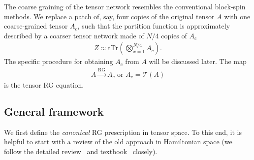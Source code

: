 \documentclass[aps,prr,reprint,superscriptaddress,floatfix]{revtex4-2}
\newcommand{\tTr}{\mathrm{tTr}}
\begin{document}
The coarse graining of the tensor network resembles the conventional block-spin methods.
We replace a patch of, say, four copies of the original tensor $A$ with one coarse-grained tensor $A_c$, such that the partition function is approximately described by a coarser tensor network made of $N/4$ copies of $A_c$
%
\begin{align}\label{eq:ZafterRG}
    Z \approx \tTr\left(\bigotimes_{x=1}^{N/4}A_c\right).
\end{align}
%
The specific procedure for obtaining $A_c$ from $A$ will be discussed later. The map 
%
\begin{align}\label{def:tensorRGeq}
    A \xrightarrow{\text{RG}} A_c \text{ or } A_c = \mathcal{T}(A) 
\end{align}
is the tensor RG equation.
%

\subsection{General framework\label{RGprescrip}}
We first define the \textit{canonical} RG prescription in tensor space.
To this end, it is helpful to start with a review of the old approach in Hamiltonian space (we follow the detailed review~\cite{kadanoff2014} and textbook~\cite{cardy_1996} closely).
%
\end{document}
